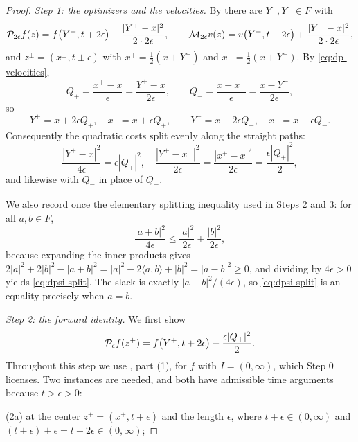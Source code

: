 \begin{proof}
\emph{Step 1: the optimizers and the velocities.}
By  there are $Y^+,Y^-\in F$ with
\begin{equation}\label{eq:dpsi-opt}
  \mathcal{P}_{2\epsilon}f(z)=f\bigl(Y^+,t+2\epsilon\bigr)
      -\frac{|Y^+-x|^2}{2\cdot2\epsilon},
  \qquad
  \mathcal{M}_{2\epsilon}v(z)=v\bigl(Y^-,t-2\epsilon\bigr)
      +\frac{|Y^--x|^2}{2\cdot2\epsilon},
\end{equation}
and $z^\pm=(x^\pm,t\pm\epsilon)$ with
$x^+=\tfrac12(x+Y^+)$ and $x^-=\tfrac12(x+Y^-)$. By
\eqref{eq:dp-velocities},
\[
  Q_+=\frac{x^+-x}{\epsilon}=\frac{Y^+-x}{2\epsilon},
  \qquad
  Q_-=\frac{x-x^-}{\epsilon}=\frac{x-Y^-}{2\epsilon},
\]
so
\begin{equation}\label{eq:dpsi-points}
  Y^+=x+2\epsilon Q_+,\quad x^+=x+\epsilon Q_+,
  \qquad
  Y^-=x-2\epsilon Q_-,\quad x^-=x-\epsilon Q_- .
\end{equation}
Consequently the quadratic costs split evenly along the straight paths:
\begin{equation}\label{eq:dpsi-costs}
  \frac{|Y^+-x|^2}{4\epsilon}=\epsilon|Q_+|^2,
  \quad
  \frac{|Y^+-x^+|^2}{2\epsilon}=\frac{|x^+-x|^2}{2\epsilon}
     =\frac{\epsilon|Q_+|^2}{2},
\end{equation}
and likewise with $Q_-$ in place of $Q_+$.

We also record once the elementary splitting inequality used in Steps 2 and 3:
for all $a,b\in F$,
\begin{equation}\label{eq:dpsi-split}
  \frac{|a+b|^2}{4\epsilon}\le\frac{|a|^2}{2\epsilon}+\frac{|b|^2}{2\epsilon},
\end{equation}
because expanding the inner products gives
$2|a|^2+2|b|^2-|a+b|^2=|a|^2-2\langle a,b\rangle+|b|^2=|a-b|^2\ge0$, and
dividing by $4\epsilon>0$ yields \eqref{eq:dpsi-split}. The slack is exactly
$|a-b|^2/(4\epsilon)$, so \eqref{eq:dpsi-split} is an equality precisely when
$a=b$.

\emph{Step 2: the forward identity.}
We first show
\begin{equation}\label{eq:dpsi-fwd-eq}
  \mathcal{P}_\epsilon f(z^+)=f\bigl(Y^+,t+2\epsilon\bigr)-\frac{\epsilon|Q_+|^2}{2}.
\end{equation}
Throughout this step we use , part (1), for $f$ with
$I=(0,\infty)$, which Step 0 licenses. Two instances are needed, and both have
admissible time arguments because $t>\epsilon>0$:

(2a) at the center $z^+=(x^+,t+\epsilon)$ and the length $\epsilon$, where
$t+\epsilon\in(0,\infty)$ and $(t+\epsilon)+\epsilon=t+2\epsilon\in(0,\infty)$;


\end{proof}
